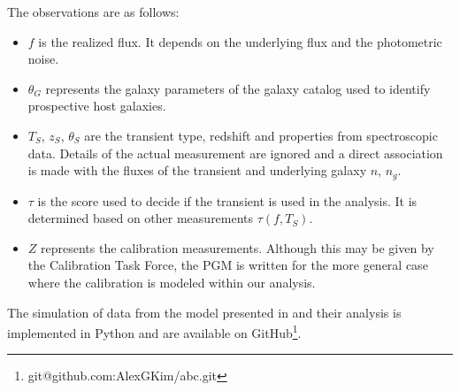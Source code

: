 \documentclass[preprint,3p]{elsarticle}
\begin{document}
The observations are as follows:
\begin{itemize}
\item ${f}$ is the realized flux.  It depends on the underlying flux and
the photometric noise.
\item $\theta_G$ represents the galaxy parameters of the
galaxy catalog used to identify prospective host galaxies.
\item ${T}_S$, ${z}_S$, ${\theta}_S$ are the transient type, redshift and properties from
spectroscopic data. Details of the actual measurement are ignored and a direct association
is made with the fluxes of the transient and underlying galaxy $n$, $n_g$.
\item $\tau$ is the score used to decide if the transient is used in the analysis.  It is
determined based on other measurements $\tau(f,T_S)$.
\item ${Z}$ represents the calibration measurements.   Although this may be given
by the Calibration Task Force, the PGM is written for the more general case where the calibration
is modeled within our analysis.
\end{itemize}


The simulation of data from the model presented in
and their analysis is implemented in Python and are available
on GitHub\footnote{{git@github.com:AlexGKim/abc.git}}.

 

\end{document}
